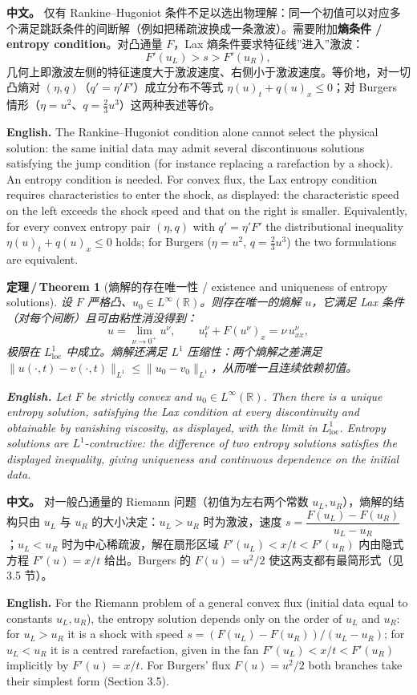 \documentclass[UTF8,11pt,a4paper]{ctexart}
\newcommand{\APS}[2]{\par\noindent\textbf{中文。} #1\par\noindent\textbf{English.} #2\par\smallskip}
\newcommand{\EN}[1]{\par\noindent \textbf{English.} #1\par}
\newtheorem{theorem}[definition]{定理\,/\,Theorem}
\newcommand{\R}{\mathbb{R}}
\begin{document}
\APS{仅有 Rankine--Hugoniot 条件不足以选出物理解：同一个初值可以对应多个满足跳跃条件的间断解（例如把稀疏波换成一条激波）。需要附加\textbf{熵条件 / entropy condition}。对凸通量 $F$，Lax 熵条件要求特征线''进入''激波：
\[
F'(u_L)>s>F'(u_R),
\]
几何上即激波左侧的特征速度大于激波速度、右侧小于激波速度。等价地，对一切凸熵对 $(\eta,q)$（$q'=\eta'F'$）成立分布不等式 $\eta(u)_t+q(u)_x\le0$；对 Burgers 情形（$\eta=u^2$、$q=\frac23u^3$）这两种表述等价。}{The Rankine--Hugoniot condition alone cannot select the physical solution: the same initial data may admit several discontinuous solutions satisfying the jump condition (for instance replacing a rarefaction by a shock). An entropy condition is needed. For convex flux, the Lax entropy condition requires characteristics to enter the shock, as displayed: the characteristic speed on the left exceeds the shock speed and that on the right is smaller. Equivalently, for every convex entropy pair $(\eta,q)$ with $q'=\eta'F'$ the distributional inequality $\eta(u)_t+q(u)_x\le0$ holds; for Burgers ($\eta=u^2$, $q=\frac23u^3$) the two formulations are equivalent.}

\begin{theorem}[熵解的存在唯一性 / existence and uniqueness of entropy solutions]\label{thm:entropy}
设 $F$ 严格凸、$u_0\in L^\infty(\R)$。则存在唯一的熵解 $u$，它满足 Lax 条件（对每个间断）且可由粘性消没得到：
\[
u=\lim_{\nu\to0^+}u^\nu,\qquad u^\nu_t+F(u^\nu)_x=\nu\,u^\nu_{xx},
\]
极限在 $L^1_{\mathrm{loc}}$ 中成立。熵解还满足 $L^1$ 压缩性：两个熵解之差满足 $\|u(\cdot,t)-v(\cdot,t)\|_{L^1}\le\|u_0-v_0\|_{L^1}$，从而唯一且连续依赖初值。
\EN{Let $F$ be strictly convex and $u_0\in L^\infty(\R)$. Then there is a unique entropy solution, satisfying the Lax condition at every discontinuity and obtainable by vanishing viscosity, as displayed, with the limit in $L^1_{\mathrm{loc}}$. Entropy solutions are $L^1$-contractive: the difference of two entropy solutions satisfies the displayed inequality, giving uniqueness and continuous dependence on the initial data.}
\end{theorem}

\APS{对一般凸通量的 Riemann 问题（初值为左右两个常数 $u_L,u_R$），熵解的结构只由 $u_L$ 与 $u_R$ 的大小决定：$u_L>u_R$ 时为激波，速度 $s=\dfrac{F(u_L)-F(u_R)}{u_L-u_R}$；$u_L<u_R$ 时为中心稀疏波，解在扇形区域 $F'(u_L)<x/t<F'(u_R)$ 内由隐式方程 $F'(u)=x/t$ 给出。Burgers 的 $F(u)=u^2/2$ 使这两支都有最简形式（见 3.5 节）。}{For the Riemann problem of a general convex flux (initial data equal to constants $u_L,u_R$), the entropy solution depends only on the order of $u_L$ and $u_R$: for $u_L>u_R$ it is a shock with speed $s=(F(u_L)-F(u_R))/(u_L-u_R)$; for $u_L<u_R$ it is a centred rarefaction, given in the fan $F'(u_L)<x/t<F'(u_R)$ implicitly by $F'(u)=x/t$. For Burgers' flux $F(u)=u^2/2$ both branches take their simplest form (Section 3.5).}
\end{document}
